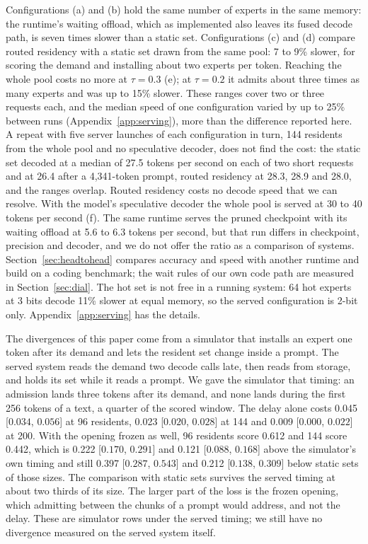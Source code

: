 \documentclass[11pt]{article}
\newcommand{\ci}[2]{[$#1$, $#2$]}
\begin{document}
Configurations (a) and (b) hold the same number of experts in the same memory: the runtime's waiting offload, which as implemented also leaves its fused decode path, is seven times slower than a static set. Configurations (c) and (d) compare routed residency with a static set drawn from the same pool: 7 to 9\% slower, for scoring the demand and installing about two experts per token. Reaching the whole pool costs no more at $\tau=0.3$ (e); at $\tau=0.2$ it admits about three times as many experts and was up to 15\% slower. These ranges cover two or three requests each, and the median speed of one configuration varied by up to 25\% between runs (Appendix~\ref{app:serving}), more than the difference reported here. A repeat with five server launches of each configuration in turn, 144 residents from the whole pool and no speculative decoder, does not find the cost: the static set decoded at a median of 27.5 tokens per second on each of two short requests and at 26.4 after a 4{,}341-token prompt, routed residency at 28.3, 28.9 and 28.0, and the ranges overlap. Routed residency costs no decode speed that we can resolve. With the model's speculative decoder the whole pool is served at 30
to 40 tokens per second (f). The same runtime serves the pruned checkpoint with its waiting offload at 5.6 to 6.3 tokens per second, but that run differs in checkpoint, precision and decoder, and we do not offer the ratio as a comparison of systems. Section~\ref{sec:headtohead} compares accuracy and speed with another runtime and build on a coding benchmark; the wait rules of our own code path are measured in Section~\ref{sec:dial}. The hot set is not free in a running system: 64 hot
experts at 3 bits decode 11\% slower at equal memory, so the served configuration is 2-bit
only. Appendix~\ref{app:serving} has the details.

The divergences of this paper come from a simulator that installs an expert one token after its demand and lets the resident set change inside a prompt. The served system reads the demand two decode calls late, then reads from storage, and holds its set while it reads a prompt. We gave the simulator that timing: an admission lands three tokens after its demand, and none lands during the first 256 tokens of a text, a quarter of the scored window. The delay alone costs 0.045 \ci{0.034}{0.056} at 96 residents, 0.023 \ci{0.020}{0.028} at 144 and 0.009 \ci{0.000}{0.022} at 200. With the opening frozen as well, 96 residents score 0.612 and 144 score 0.442, which is 0.222 \ci{0.170}{0.291} and 0.121 \ci{0.088}{0.168} above the simulator's own timing and still 0.397 \ci{0.287}{0.543} and 0.212 \ci{0.138}{0.309} below static sets of those sizes. The comparison with static sets survives the served timing at about two thirds of its size. The larger part of the loss is the frozen opening, which admitting between the chunks of a prompt would address, and not the delay. These are simulator rows under the served timing; we still have no divergence measured on the served system itself.
\end{document}
